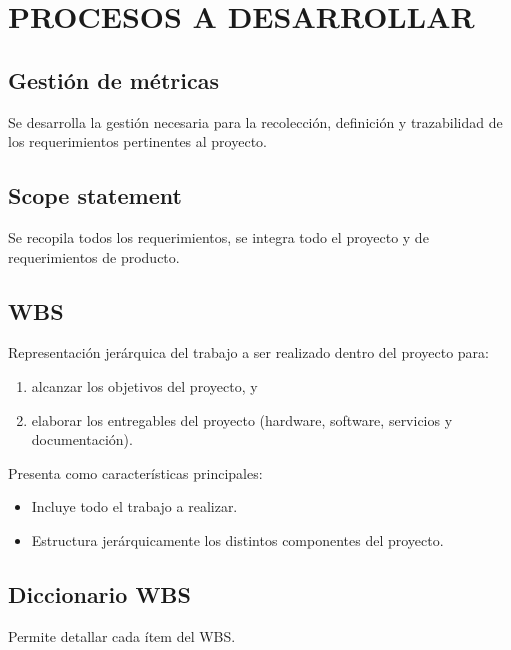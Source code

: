 \chapter{PROCESOS A DESARROLLAR}
%
\section{Gesti\'on de m\'etricas}
Se desarrolla la gesti\'on necesaria para la recolecci\'on, definici\'on y trazabilidad
de los requerimientos pertinentes al proyecto.
%
\section{Scope statement}
Se recopila todos los requerimientos, se integra todo el proyecto y de requerimientos de producto.
%
\section{WBS}
Representaci\'on jer\'arquica del trabajo a ser realizado dentro del proyecto para: 
\begin{enumerate}
	\item alcanzar los objetivos del proyecto, y
	\item elaborar los entregables del proyecto (hardware, software, servicios y documentaci\'on).
\end{enumerate}
%
Presenta como caracter\'isticas principales:
\begin{itemize}
	\item Incluye todo el trabajo a realizar.
	\item Estructura jer\'arquicamente los distintos componentes del proyecto.
\end{itemize}
%
\section{Diccionario WBS}
Permite detallar cada \'item del WBS.